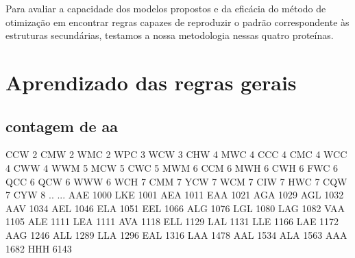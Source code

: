 Para avaliar a capacidade dos modelos propostos e da eficácia do método de otimização em encontrar regras capazes de reproduzir o padrão correspondente às estruturas secundárias, testamos a nossa metodologia nessas quatro proteínas.



\chapter{Aprendizado das regras gerais}




\section{contagem de aa}
CCW      2
CMW      2
WMC      2
WPC      3
WCW      3
CHW      4
MWC      4
CCC      4
CMC      4
WCC      4
CWW      4
WWM      5
MCW      5
CWC      5
MWM      6
CCM      6
MWH      6
CWH      6
FWC      6
QCC      6
QCW      6
WWW      6
WCH      7
CMM      7
YCW      7
WCM      7
CIW      7
HWC      7
CQW      7
CYW      8
..     ...
AAE   1000
LKE   1001
AEA   1011
EAA   1021
AGA   1029
AGL   1032
AAV   1034
AEL   1046
ELA   1051
EEL   1066
ALG   1076
LGL   1080
LAG   1082
VAA   1105
ALE   1111
LEA   1111
AVA   1118
ELL   1129
LAL   1131
LLE   1166
LAE   1172
AAG   1246
ALL   1289
LLA   1296
EAL   1316
LAA   1478
AAL   1534
ALA   1563
AAA   1682
HHH   6143